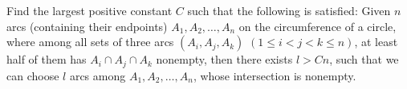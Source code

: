 Find the largest positive constant $C$ such that the following is satisfied: Given $n$ arcs (containing their endpoints) $A_1,A_2,\ldots ,A_n$ on the circumference of a circle, where among all sets of three arcs $(A_i,A_j,A_k)$ $(1\le i< j< k\le n)$, at least half of them has $A_i\cap A_j\cap A_k$ nonempty, then there exists $l>Cn$, such that we can choose $l$ arcs among $A_1,A_2,\ldots ,A_n$, whose intersection is nonempty.